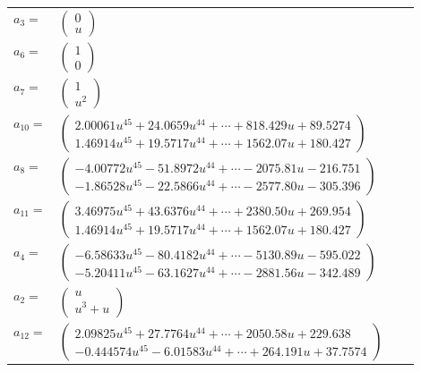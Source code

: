 \documentclass[1p]{elsarticle_modified}
\theoremstyle{definition}
\begin{document}
\begin{tabular}{m{7pt} m{180pt} m{7pt} m{180pt} }
\flushright $a_{3}=$&$\begin{pmatrix}0\\u\end{pmatrix}$ \\
\flushright $a_{6}=$&$\begin{pmatrix}1\\0\end{pmatrix}$ \\
\flushright $a_{7}=$&$\begin{pmatrix}1\\u^2\end{pmatrix}$ \\
\flushright $a_{10}=$&$\begin{pmatrix}2.00061 u^{45}+24.0659 u^{44}+\cdots+818.429 u+89.5274\\1.46914 u^{45}+19.5717 u^{44}+\cdots+1562.07 u+180.427\end{pmatrix}$ \\
\flushright $a_{8}=$&$\begin{pmatrix}-4.00772 u^{45}-51.8972 u^{44}+\cdots-2075.81 u-216.751\\-1.86528 u^{45}-22.5866 u^{44}+\cdots-2577.80 u-305.396\end{pmatrix}$ \\
\flushright $a_{11}=$&$\begin{pmatrix}3.46975 u^{45}+43.6376 u^{44}+\cdots+2380.50 u+269.954\\1.46914 u^{45}+19.5717 u^{44}+\cdots+1562.07 u+180.427\end{pmatrix}$ \\
\flushright $a_{4}=$&$\begin{pmatrix}-6.58633 u^{45}-80.4182 u^{44}+\cdots-5130.89 u-595.022\\-5.20411 u^{45}-63.1627 u^{44}+\cdots-2881.56 u-342.489\end{pmatrix}$ \\
\flushright $a_{2}=$&$\begin{pmatrix}u\\u^3+u\end{pmatrix}$ \\
\flushright $a_{12}=$&$\begin{pmatrix}2.09825 u^{45}+27.7764 u^{44}+\cdots+2050.58 u+229.638\\-0.444574 u^{45}-6.01583 u^{44}+\cdots+264.191 u+37.7574\end{pmatrix}$ \\

\end{tabular}
\end{document}
